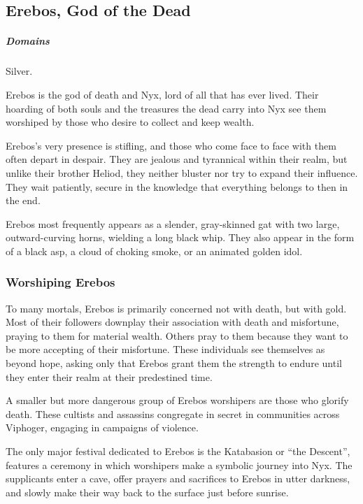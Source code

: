 \subsection*{Erebos, God of the Dead} \label{ssec::erebos}
    \subparagraph{Domains} Silver.

    Erebos is the god of death and Nyx, lord of all that has ever lived.
    Their hoarding of both souls and the treasures the dead carry into Nyx see them worshiped by those who desire to collect and keep wealth.

    Erebos's very presence is stifling, and those who come face to face with them often depart in despair.
    They are jealous and tyrannical within their realm, but unlike their brother Heliod, they neither bluster nor try to expand their influence.
    They wait patiently, secure in the knowledge that everything belongs to then in the end.

    Erebos most frequently appears as a slender, gray-skinned gat with two large, outward-curving horns, wielding a long black whip.
    They also appear in the form of a black asp, a cloud of choking smoke, or an animated golden idol.


    \subsubsection{Worshiping Erebos}
        To many mortals, Erebos is primarily concerned not with death, but with gold.
        Most of their followers downplay their association with death and misfortune, praying to them for material wealth.
        Others pray to them because they want to be more accepting of their misfortune.
        These individuals see themselves as beyond hope, asking only that Erebos grant them the strength to endure until they enter their realm at their predestined time.

        A smaller but more dangerous group of Erebos worshipers are those who glorify death.
        These cultists and assassins congregate in secret in communities across Viphoger, engaging in campaigns of violence.

        The only major festival dedicated to Erebos is the Katabasion or ``the Descent'', features a ceremony in which worshipers make a symbolic journey into Nyx.
        The supplicants enter a cave, offer prayers and sacrifices to Erebos in utter darkness, and slowly make their way back to the surface just before sunrise.
